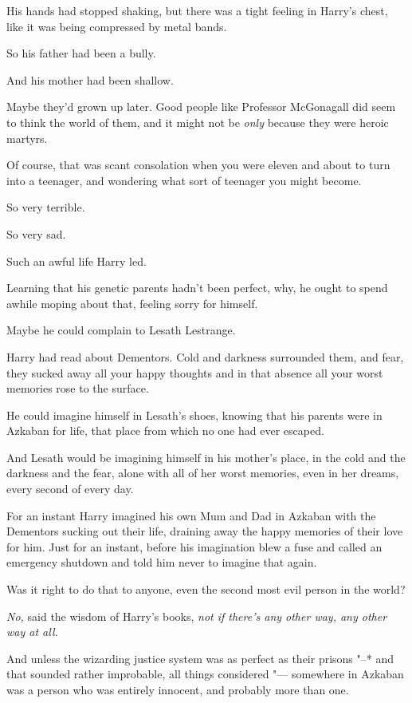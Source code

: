 His hands had stopped shaking, but there was a tight feeling in Harry's
chest, like it was being compressed by metal bands.

So his father had been a bully.

And his mother had been shallow.

Maybe they'd grown up later. Good people like Professor McGonagall did
seem to think the world of them, and it might not be \emph{only} because
they were heroic martyrs.

Of course, that was scant consolation when you were eleven and about to
turn into a teenager, and wondering what sort of teenager you might
become.

So very terrible.

So very sad.

Such an awful life Harry led.

Learning that his genetic parents hadn't been perfect, why, he ought to
spend awhile moping about that, feeling sorry for himself.

Maybe he could complain to Lesath Lestrange.

Harry had read about Dementors. Cold and darkness surrounded them, and
fear, they sucked away all your happy thoughts and in that absence all
your worst memories rose to the surface.

He could imagine himself in Lesath's shoes, knowing that his parents
were in Azkaban for life, that place from which no one had ever escaped.

And Lesath would be imagining himself in his mother's place, in the cold
and the darkness and the fear, alone with all of her worst memories,
even in her dreams, every second of every day.

For an instant Harry imagined his own Mum and Dad in Azkaban with the
Dementors sucking out their life, draining away the happy memories of
their love for him. Just for an instant, before his imagination blew a
fuse and called an emergency shutdown and told him never to imagine that
again.

Was it right to do that to anyone, even the second most evil person in
the world?

\emph{No,} said the wisdom of Harry's books, \emph{not if there's any
other way, any other way at all.}

And unless the wizarding justice system was as perfect as their prisons
"--* and that sounded rather improbable, all things considered "--- somewhere
in Azkaban was a person who was entirely innocent, and probably more
than one.

